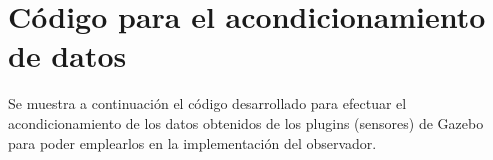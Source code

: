 \chapter{Código para el acondicionamiento de datos}
\label{app:acondicionamientoDatos}

Se muestra a continuación el código desarrollado para efectuar el acondicionamiento de los datos obtenidos de los plugins (sensores) de Gazebo para poder emplearlos en la implementación del observador. \\ \par 

